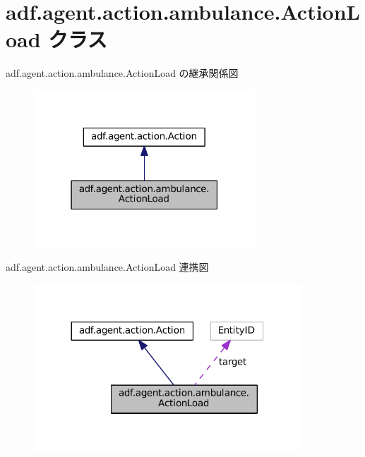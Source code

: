 \hypertarget{classadf_1_1agent_1_1action_1_1ambulance_1_1ActionLoad}{}\section{adf.\+agent.\+action.\+ambulance.\+Action\+Load クラス}
\label{classadf_1_1agent_1_1action_1_1ambulance_1_1ActionLoad}


adf.\+agent.\+action.\+ambulance.\+Action\+Load の継承関係図
\nopagebreak
\begin{figure}[H]
\begin{center}
\leavevmode
\includegraphics[width=235pt]{classadf_1_1agent_1_1action_1_1ambulance_1_1ActionLoad__inherit__graph}
\end{center}
\end{figure}


adf.\+agent.\+action.\+ambulance.\+Action\+Load 連携図
\nopagebreak
\begin{figure}[H]
\begin{center}
\leavevmode
\includegraphics[width=284pt]{classadf_1_1agent_1_1action_1_1ambulance_1_1ActionLoad__coll__graph}
\end{center}
\end{figure}
